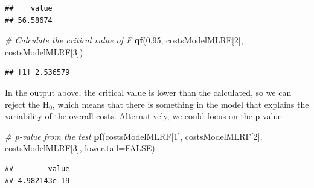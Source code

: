 \documentclass[
]{book}
\newenvironment{Shaded}{\begin{snugshade}}{\end{snugshade}}
\newcommand{\AttributeTok}[1]{\textcolor[rgb]{0.13,0.29,0.53}{#1}}
\newcommand{\CommentTok}[1]{\textcolor[rgb]{0.56,0.35,0.01}{\textit{#1}}}
\newcommand{\ConstantTok}[1]{\textcolor[rgb]{0.56,0.35,0.01}{#1}}
\newcommand{\DecValTok}[1]{\textcolor[rgb]{0.00,0.00,0.81}{#1}}
\newcommand{\FloatTok}[1]{\textcolor[rgb]{0.00,0.00,0.81}{#1}}
\newcommand{\FunctionTok}[1]{\textcolor[rgb]{0.13,0.29,0.53}{\textbf{#1}}}
\newcommand{\NormalTok}[1]{#1}
\newcommand{\OtherTok}[1]{\textcolor[rgb]{0.56,0.35,0.01}{#1}}
\newcommand{\SpecialCharTok}[1]{\textcolor[rgb]{0.81,0.36,0.00}{\textbf{#1}}}
\theoremstyle{definition}
\theoremstyle{definition}
\theoremstyle{definition}
\theoremstyle{definition}
\theoremstyle{remark}
\begin{document}
\begin{Shaded}
\end{Shaded}

\begin{verbatim}
##    value 
## 56.58674
\end{verbatim}

\begin{Shaded}
\begin{Highlighting}[]
\CommentTok{\# Calculate the critical value of F}
\FunctionTok{qf}\NormalTok{(}\FloatTok{0.95}\NormalTok{, costsModelMLRF[}\DecValTok{2}\NormalTok{], costsModelMLRF[}\DecValTok{3}\NormalTok{])}
\end{Highlighting}
\end{Shaded}

\begin{verbatim}
## [1] 2.536579
\end{verbatim}

In the output above, the critical value is lower than the calculated, so we can reject the H\(_0\), which means that there is something in the model that explains the variability of the overall costs. Alternatively, we could focus on the p-value:

\begin{Shaded}
\begin{Highlighting}[]
\CommentTok{\# p{-}value from the test}
\FunctionTok{pf}\NormalTok{(costsModelMLRF[}\DecValTok{1}\NormalTok{], costsModelMLRF[}\DecValTok{2}\NormalTok{], costsModelMLRF[}\DecValTok{3}\NormalTok{], }\AttributeTok{lower.tail=}\ConstantTok{FALSE}\NormalTok{)}
\end{Highlighting}
\end{Shaded}

\begin{verbatim}
##        value 
## 4.982143e-19
\end{verbatim}
\end{document}
